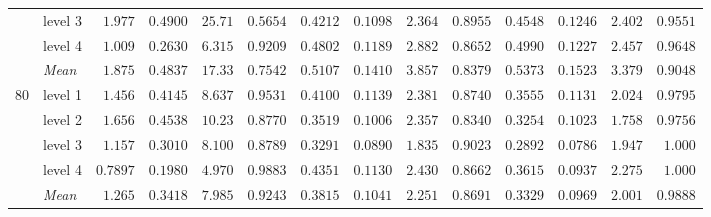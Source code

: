 \begin{table}[htbp]
\begin{tabular}{llrrrrrrrrrrrr}
 & level 3 & $1.977$ & $0.4900$ & $25.71$ & $0.5654$ & {\boldmath$0.4212$} & {\boldmath$0.1098$} & {\boldmath$2.364$} & $0.8955$ & $0.4548$ & $0.1246$ & $2.402$ & {\boldmath$0.9551$} \\
 & level 4 & $1.009$ & $0.2630$ & $6.315$ & $0.9209$ & {\boldmath$0.4802$} & {\boldmath$0.1189$} & $2.882$ & $0.8652$ & $0.4990$ & $0.1227$ & {\boldmath$2.457$} & {\boldmath$0.9648$} \\
 & \textit{Mean} & $1.875$ & $0.4837$ & $17.33$ & $0.7542$ & \colorbox{green!20}{\boldmath$0.5107$} & \colorbox{green!20}{\boldmath$0.1410$} & $3.857$ & $0.8379$ & $0.5373$ & $0.1523$ & \colorbox{green!20}{\boldmath$3.379$} & \colorbox{green!20}{\boldmath$0.9048$} \\
\midrule
\multirow{5}{*}{80} & level 1 & $1.456$ & $0.4145$ & $8.637$ & {\boldmath$0.9531$} & $0.4100$ & $0.1139$ & $2.381$ & $0.8740$ & {\boldmath$0.3555$} & {\boldmath$0.1131$} & {\boldmath$2.024$} & $0.9795$ \\
 & level 2 & $1.656$ & $0.4538$ & $10.23$ & $0.8770$ & $0.3519$ & {\boldmath$0.1006$} & $2.357$ & $0.8340$ & {\boldmath$0.3254$} & $0.1023$ & {\boldmath$1.758$} & {\boldmath$0.9756$} \\
 & level 3 & $1.157$ & $0.3010$ & $8.100$ & $0.8789$ & $0.3291$ & $0.0890$ & {\boldmath$1.835$} & {\boldmath$0.9023$} & {\boldmath$0.2892$} & {\boldmath$0.0786$} & $1.947$ & $1.000$ \\
 & level 4 & $0.7897$ & $0.1980$ & $4.970$ & {\boldmath$0.9883$} & $0.4351$ & $0.1130$ & $2.430$ & $0.8662$ & {\boldmath$0.3615$} & {\boldmath$0.0937$} & {\boldmath$2.275$} & $1.000$ \\
 & \textit{Mean} & $1.265$ & $0.3418$ & $7.985$ & \colorbox{green!20}{\boldmath$0.9243$} & $0.3815$ & $0.1041$ & $2.251$ & $0.8691$ & \colorbox{green!20}{\boldmath$0.3329$} & \colorbox{green!20}{\boldmath$0.0969$} & \colorbox{green!20}{\boldmath$2.001$} & $0.9888$ \\
\bottomrule
\end{tabular}
\end{table}
